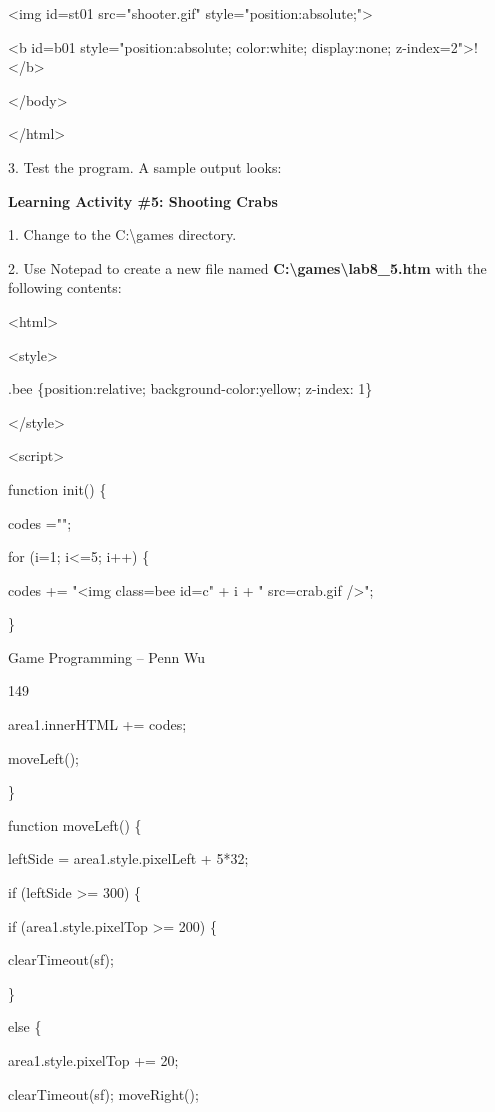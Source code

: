 \documentclass[
]{article}
\begin{document}
\textless img id=st01 src="shooter.gif"
style="position:absolute;"\textgreater{}

\textless b id=b01 style="position:absolute; color:white; display:none;
z-index=2"\textgreater!\textless/b\textgreater{}

\textless/body\textgreater{}

\textless/html\textgreater{}

3. Test the program. A sample output looks:

\textbf{Learning Activity \#5: Shooting Crabs}

1. Change to the C:\textbackslash games directory.

2. Use Notepad to create a new file named
\textbf{C:\textbackslash games\textbackslash lab8\_5.htm} with the
following contents:

\textless html\textgreater{}

\textless style\textgreater{}

.bee \{position:relative; background-color:yellow; z-index: 1\}

\textless/style\textgreater{}

\textless script\textgreater{}

function init() \{

codes ="";

for (i=1; i\textless=5; i++) \{

codes += "\textless img class=\textquotesingle bee\textquotesingle{}
id=c" + i + " src=\textquotesingle crab.gif\textquotesingle{}
/\textgreater";

\}

Game Programming -- Penn Wu

149

\protect\hypertarget{index_split_009.htmlux5cux23p150}{}{}
area1.innerHTML += codes;

moveLeft();

\}

function moveLeft() \{

leftSide = area1.style.pixelLeft + 5*32;

if (leftSide \textgreater= 300) \{

if (area1.style.pixelTop \textgreater= 200) \{

clearTimeout(sf);

\}

else \{

area1.style.pixelTop += 20;

clearTimeout(sf); moveRight();
\end{document}

